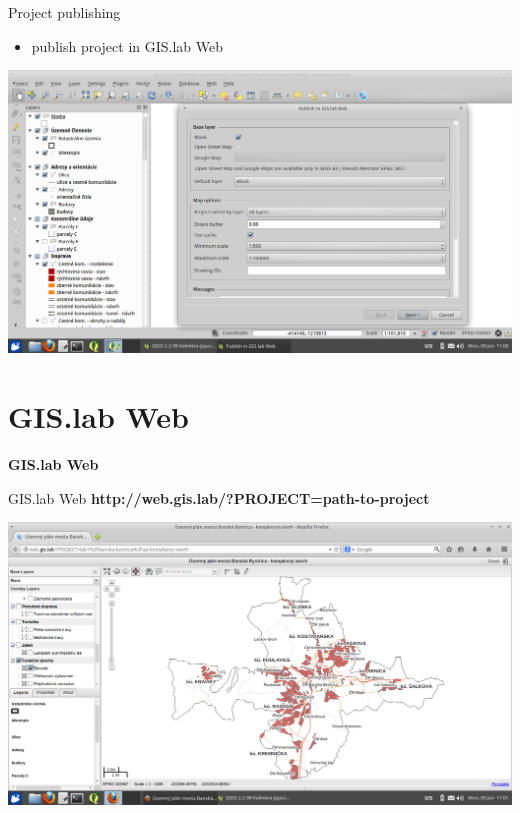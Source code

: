 \documentclass[12pt]{beamer}
\begin{document}
\begin{frame}{Project publishing}
	\begin{itemize}
		\item publish project in GIS.lab Web
	\end{itemize}
	\begin{center}
		\includegraphics[keepaspectratio=true,height=0.6\textheight]{images/real-world-example/project-publish.png}
	\end{center}
\end{frame}


\section{GIS.lab Web}
\begin{frame}
	\begin{center}
		\LARGE\textbf{GIS.lab Web}
	\end{center}
\end{frame}


\begin{frame}{GIS.lab Web}
	\textbf{http://web.gis.lab/?PROJECT=path-to-project}
	\begin{center}
		\includegraphics[keepaspectratio=true,height=0.7\textheight]{images/real-world-example/project-gislab-web.png}
	\end{center}
\end{frame}
\end{document}

